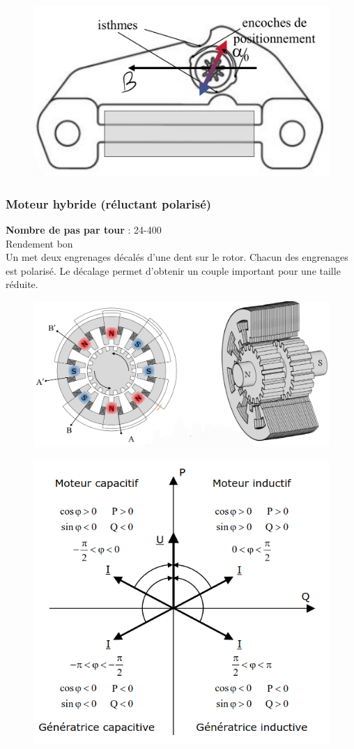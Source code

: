 \documentclass[../main.tex]{subfiles}
\begin{document}
\begin{figure}[hbt!]
    \centering
    \includegraphics[width=.5\textwidth]{IMAGES/machineelec/IMG_0160.jpeg}
\end{figure}

\subsubsection{Moteur hybride (réluctant polarisé)}
\textbf{Nombre de pas par tour} : 24-400\\
Rendement bon\\

Un met deux engrenages décalés d'une dent sur le rotor. Chacun des engrenages est polarisé. Le décalage permet d'obtenir un couple important pour une taille réduite.\\

\begin{figure}[hbt!]
    \centering
    \includegraphics[width=.6\textwidth]{IMAGES/machineelec/IMG_0161.jpeg}
\end{figure}

\begin{figure}[hbt!]
    \centering
    \includegraphics[width=.6\textwidth]{IMAGES/machineelec/Screenshot from 2024-01-13 12-35-56.png}

\end{figure}
\end{document}
